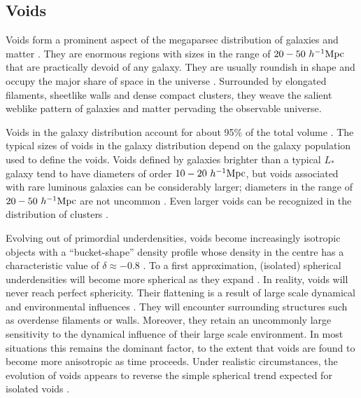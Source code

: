\subsection{Voids}
\label{sec:voids}
Voids form a prominent aspect of the megaparsec distribution of galaxies and matter \citep{chincarini75, gregory78, einasto80, kirshner81, 
kirshner87, delapparent86, weygaert91, colless03, tegmark04, furlanetto06, huchra12}.
They are enormous regions with sizes in the range of $20-50~h^{-1} {\rm Mpc}$ that are practically devoid of any galaxy. They are usually roundish in 
shape and occupy the major share of space in the universe \citep[see][for a recent review]{weygaert11}. Surrounded by 
elongated filaments, sheetlike walls and dense compact clusters, they weave the salient weblike pattern of galaxies and matter 
pervading the observable universe.

Voids in the galaxy distribution account for about 95\% of the total volume \citep{joeveer78, kauffmann91, elad96, elad97,
rojas05, pan12}. The typical sizes of voids in the galaxy distribution depend on the galaxy 
population used to define the voids. Voids defined by galaxies brighter than a typical $L_*$ galaxy tend to have diameters 
of order $10-20~h^{-1} {\rm Mpc}$, but voids associated with rare luminous galaxies can be considerably larger; diameters in the range 
of $20-50~h^{-1} {\rm Mpc}$ are not uncommon \citep{hoylevogeley02, plionis02}. Even larger voids can be recognized in the 
distribution of clusters \citep{bahcall88, einasto94, einasto01}.

Evolving out of primordial underdensities, voids become increasingly isotropic objects \citep{icke84} with a ``bucket-shape'' density 
profile whose density in the centre has a characteristic value of $\delta\approx -0.8$ \citep{sheth04}. To a first approximation, 
(isolated) spherical underdensities will become more spherical as they expand \citep{icke84,weygaert93}. In reality, voids will never 
reach perfect sphericity. Their flattening is a result of large scale dynamical and environmental influences \citep{platen08}. They 
will encounter surrounding structures such as overdense filaments or walls. Moreover, they retain an uncommonly large 
sensitivity to the dynamical influence of their large scale environment. In most situations this remains the dominant factor, 
to the extent that voids are found to become more anisotropic as time proceeds. Under realistic circumstances, the evolution 
of voids appears to reverse the simple spherical trend expected for isolated voids \citep{icke84}.

